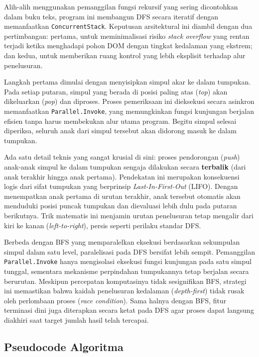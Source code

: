 \documentclass[12pt]{article}
\begin{document}
Alih-alih menggunakan pemanggilan fungsi rekursif yang sering dicontohkan dalam buku teks, program ini membangun DFS secara iteratif dengan memanfaatkan \texttt{ConcurrentStack}. Keputusan arsitektural ini diambil dengan dua pertimbangan: pertama, untuk meminimalisasi risiko \textit{stack overflow} yang rentan terjadi ketika menghadapi pohon DOM dengan tingkat kedalaman yang ekstrem; dan kedua, untuk memberikan ruang kontrol yang lebih eksplisit terhadap alur penelusuran.

Langkah pertama dimulai dengan menyisipkan simpul akar ke dalam tumpukan. Pada setiap putaran, simpul yang berada di posisi paling atas (\textit{top}) akan dikeluarkan (\textit{pop}) dan diproses. Proses pemeriksaan ini dieksekusi secara asinkron memanfaatkan \texttt{Parallel.Invoke}, yang memungkinkan fungsi kunjungan berjalan efisien tanpa harus membekukan alur utama program. Begitu simpul selesai diperiksa, seluruh anak dari simpul tersebut akan didorong masuk ke dalam tumpukan.

Ada satu detail teknis yang sangat krusial di sini: proses pendorongan (\textit{push}) anak-anak simpul ke dalam tumpukan sengaja dilakukan secara \textbf{terbalik} (dari anak terakhir hingga anak pertama). Pendekatan ini merupakan konsekuensi logis dari sifat tumpukan yang berprinsip \textit{Last-In-First-Out} (LIFO). Dengan menempatkan anak pertama di urutan terakhir, anak tersebut otomatis akan menduduki posisi puncak tumpukan dan dievaluasi lebih dulu pada putaran berikutnya. Trik matematis ini menjamin urutan penelusuran tetap mengalir dari kiri ke kanan (\textit{left-to-right}), persis seperti perilaku standar DFS.

Berbeda dengan BFS yang memparalelkan eksekusi berdasarkan sekumpulan simpul dalam satu level, paralelisasi pada DFS bersifat lebih sempit. Pemanggilan \texttt{Parallel.Invoke} hanya mengisolasi eksekusi fungsi kunjungan pada satu simpul tunggal, sementara mekanisme perpindahan tumpukannya tetap berjalan secara berurutan. Meskipun percepatan komputasinya tidak sesignifikan BFS, strategi ini memastikan bahwa kaidah penelusuran kedalaman (\textit{depth-first}) tidak rusak oleh perlombaan proses (\textit{race condition}). Sama halnya dengan BFS, fitur terminasi dini juga diterapkan secara ketat pada DFS agar proses dapat langsung diakhiri saat target jumlah hasil telah tercapai.

\subsection{Pseudocode Algoritma}
\end{document}
